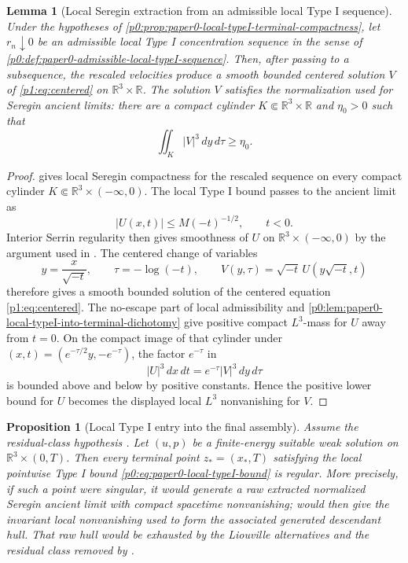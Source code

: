 \documentclass[11pt]{amsart}
\theoremstyle{plain}
\newtheorem{lemma}[lemma]{Lemma}
\newtheorem{proposition}[proposition]{Proposition}
\theoremstyle{definition}
\theoremstyle{remark}
\numberwithin{equation}{section}
\begin{document}
\begin{lemma}[Local Seregin extraction from an admissible local Type I sequence]
\label{p0:lem:local-seregin-extraction}
Under the hypotheses of
\cref{p0:prop:paper0-local-typeI-terminal-compactness}, let \(r_n\downarrow0\)
be an admissible local Type I concentration sequence in the sense of
\cref{p0:def:paper0-admissible-local-typeI-sequence}.  Then, after passing to
a subsequence, the rescaled velocities produce a smooth bounded centered
solution \(V\) of \eqref{p1:eq:centered} on
\(\mathbb R^3\times\mathbb R\).  The solution \(V\) satisfies the
normalization used for Seregin ancient limits: there are a compact cylinder
\(K\Subset\mathbb R^3\times\mathbb R\) and \(\eta_0>0\) such that
\[
   \iint_K |V|^3\,dy\,d\tau\ge\eta_0 .
\]
\end{lemma}

\begin{proof}
 gives local Seregin
compactness for the rescaled sequence on every compact cylinder
\(K\Subset\mathbb R^3\times(-\infty,0)\).  The local Type I bound passes to
the ancient limit as
\[
   |U(x,t)|\le M(-t)^{-1/2},\qquad t<0.
\]
Interior Serrin regularity then gives smoothness of \(U\) on
\(\mathbb R^3\times(-\infty,0)\) by the argument used in
.  The centered change of variables
\[
   y=\frac{x}{\sqrt{-t}},\qquad \tau=-\log(-t),\qquad
   V(y,\tau)=\sqrt{-t}\,U(y\sqrt{-t},t)
\]
therefore gives a smooth bounded solution of the centered equation
\eqref{p1:eq:centered}.  The no-escape part of local admissibility and
\cref{p0:lem:paper0-local-typeI-into-terminal-dichotomy} give positive
compact \(L^3\)-mass for \(U\) away from \(t=0\).  On the compact image of
that cylinder under \((x,t)=(e^{-\tau/2}y,-e^{-\tau})\), the factor
\(e^{-\tau}\) in
\[
   |U|^3\,dx\,dt=e^{-\tau}|V|^3\,dy\,d\tau
\]
is bounded above and below by positive constants.  Hence the positive lower
bound for \(U\) becomes the displayed local \(L^3\) nonvanishing for \(V\).
\end{proof}

\begin{proposition}[Local Type I entry into the final assembly]
\label{p0:prop:local-typeI-entry-final-assembly}
Assume the residual-class hypothesis .
Let \((u,p)\) be a finite-energy suitable weak solution on
\(\mathbb R^3\times(0,T)\).  Then every terminal point \(z_*=(x_*,T)\) satisfying
the local pointwise Type I bound \eqref{p0:eq:paper0-local-typeI-bound}
is regular.  More precisely, if such a point were singular, it would generate
a raw extracted normalized Seregin ancient limit with compact spacetime
nonvanishing;  would then give the
invariant local nonvanishing used to form the associated generated descendant
hull.  That raw hull would be exhausted by the Liouville alternatives and the
residual class removed by .
\end{proposition}
\end{document}
